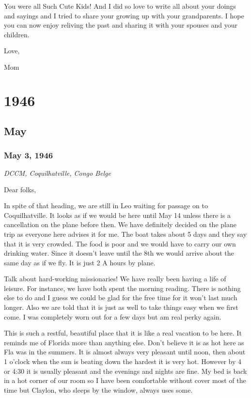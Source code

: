 \documentclass[
]{book}
\begin{document}
You were all Such Cute Kids! And I did so love to write all about your doings and sayings and I tried to share your growing up with your grandparents. I hope you can now enjoy reliving the past and sharing it with your spouses and your children.

Love,

Mom

\hypertarget{section}{%
\chapter{1946}\label{section}}

\hypertarget{may}{%
\section{May}\label{may}}

\hypertarget{may-3-1946}{%
\subsection{May 3, 1946}\label{may-3-1946}}

\emph{DCCM, Coquilhatville, Congo Belge}

Dear folks,

In spite of that heading, we are still in Leo waiting for passage on to Coquilhatville. It looks as if we would be here until May 14 unless there is a cancellation on the plane before then. We have definitely decided on the plane trip as everyone here advises it for me. The boat takes about 5 days and they say that it is very crowded. The food is poor and we would have to carry our own drinking water. Since it doesn't leave until the 8th we would arrive about the same day as if we fly. It is just 2 A hours by plane.

Talk about hard-working missionaries! We have really been having a life of leisure. For instance, we have both spent the morning reading. There is nothing else to do and I guess we could be glad for the free time for it won't last much longer. Also we are told that it is just as well to take things easy when we first come. I was completely worn out for a few days but am real perky again.

This is such a restful, beautiful place that it is like a real vacation to be here. It reminds me of Florida more than anything else. Don't believe it is as hot here as Fla was in the summers. It is almost always very pleasant until noon, then about 1 o'clock when the sun is beating down the hardest it is very hot. However by 4 or 4:30 it is usually pleasant and the evenings and nights are fine. My bed is back in a hot corner of our room so I have been comfortable without cover most of the time but Claylon, who sleeps by the window, always uses some.
\end{document}
